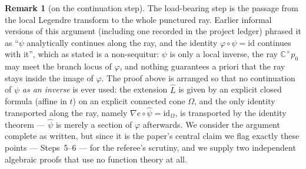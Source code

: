 \documentclass[11pt]{article}
\theoremstyle{plain}
\theoremstyle{definition}
\newtheorem{remark}[theorem]{Remark}
\newcommand{\C}{\mathbb{C}}
\begin{document}
\begin{remark}[on the continuation step]\label{rem:cont}
The load-bearing step is the passage from the local Legendre transform to
the whole punctured ray. Earlier informal versions of this argument
(including one recorded in the project ledger) phrased it as ``$\psi$
analytically continues along the ray, and the identity
$\varphi\circ\psi=\mathrm{id}$ continues with it'', which as stated is a
non-sequitur: $\psi$ is only a local inverse, the ray $\C^{\times}p_0$
may meet the branch locus of $\varphi$, and nothing guarantees a priori
that the ray stays inside the image of $\varphi$. The proof above is
arranged so that no continuation of $\psi$ \emph{as an inverse} is ever
used: the extension $\widehat L$ is given by an explicit closed formula
(affine in $t$) on an explicit connected cone $\Omega$, and the only
identity transported along the ray, namely
$\nabla e\circ\widehat\psi=\mathrm{id}_\Omega$, is transported by the
identity theorem --- $\widehat\psi$ is merely a section of $\varphi$
afterwards. We consider the argument complete as written, but since it is
the paper's central claim we flag exactly these points --- Steps~5--6 ---
for the referee's scrutiny, and we supply two independent algebraic
proofs that use no function theory at all.
\end{remark}
\end{document}
